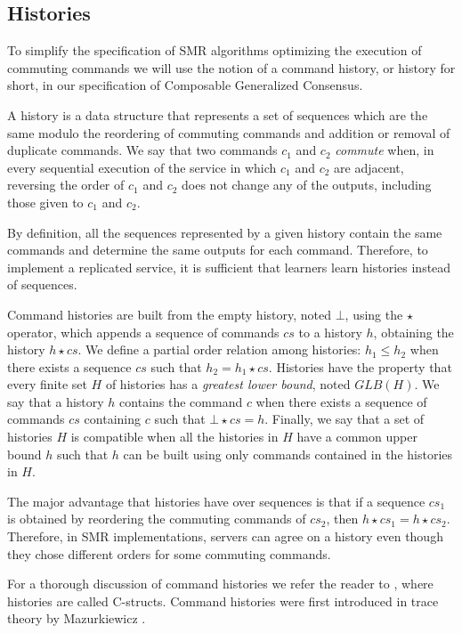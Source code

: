 \subsection{Histories}

To simplify the specification of SMR algorithms optimizing the execution of commuting commands 
we will use the notion of a command history, or history for short, in our specification of Composable Generalized Consensus.

A history is a data structure that
represents a set of sequences which are the same modulo the reordering
of commuting commands and addition or removal of duplicate commands.
We say that two commands $c_1$ and $c_2$ \emph{commute} when, in every
sequential execution of the service in which $c_1$ and $c_2$ are adjacent,
reversing the order of $c_1$ and $c_2$ does not change any of the outputs,
including those given to $c_1$ and $c_2$.

By definition, all the sequences represented by a given history contain the same commands
and determine the same outputs for each command. Therefore, to implement a
replicated service, it is sufficient that learners learn histories instead of
sequences. 

Command histories are built from the empty history, noted $\bot$, using the $\star$
operator, which appends a sequence of commands $cs$ to a history $h$, obtaining
the history $h \star cs$. We define a partial order relation among
histories: $h_1 \leq h_2$ when there exists a sequence $cs$ such that $h_2 = h_1
\star cs$. Histories have the property that every finite set $H$ of histories
has a \emph{greatest lower bound}, noted $GLB\left(H\right)$. 
We say that a history $h$ contains the command $c$ when there exists a sequence of commands 
$cs$ containing $c$ such that $\bot \star cs = h$.
Finally, we say
that a set of histories $H$ is compatible when all the histories in $H$ have a
common upper bound $h$ such that $h$ can be built using only commands contained in
the histories in $H$.

The major advantage that histories have over sequences is that if a sequence
$cs_1$ is obtained by reordering the commuting commands of $cs_2$, then $h \star
cs_1 = h \star cs_2$. Therefore, in SMR implementations, servers can agree on
a history even though they chose different orders for some commuting commands.

For a thorough discussion of command histories we refer the reader
to \cite{Lamport05GeneralizeConsensus}, where histories are called C-structs. 
Command histories were first introduced in trace theory by Mazurkiewicz 
\cite{Mazurkiewicz84Semantics}.


